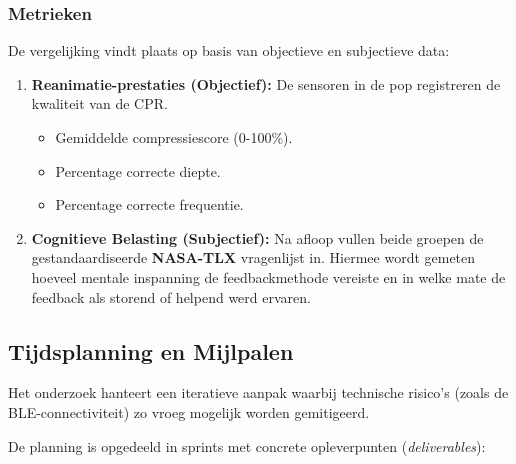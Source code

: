 \subsubsection{Metrieken}
De vergelijking vindt plaats op basis van objectieve en subjectieve data:
\begin{enumerate}
    \item \textbf{Reanimatie-prestaties (Objectief):} De sensoren in de pop registreren de kwaliteit van de CPR.
    \begin{itemize}
        \item Gemiddelde compressiescore (0-100\%).
        \item Percentage correcte diepte.
        \item Percentage correcte frequentie.
    \end{itemize}
    \item \textbf{Cognitieve Belasting (Subjectief):} Na afloop vullen beide groepen de gestandaardiseerde \textbf{NASA-TLX} vragenlijst in. 
    Hiermee wordt gemeten hoeveel mentale inspanning de feedbackmethode vereiste en in welke mate de feedback als storend of helpend werd ervaren.
\end{enumerate}

\subsection{Tijdsplanning en Mijlpalen}
Het onderzoek hanteert een iteratieve aanpak waarbij technische risico's (zoals de BLE-connectiviteit) zo vroeg mogelijk worden gemitigeerd.

De planning is opgedeeld in sprints met concrete opleverpunten (\textit{deliverables}):

